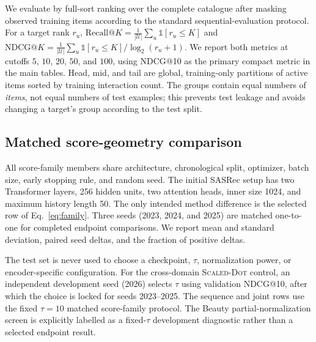 \documentclass[sigconf,anonymous,review]{acmart}
\newcommand{\scaledot}{\textsc{Scaled-Dot}}
\begin{document}
We evaluate by full-sort ranking over the complete catalogue after masking observed training items according to the standard sequential-evaluation protocol. For a target rank $r_u$, $\mathrm{Recall@}K=\frac{1}{|\mathcal U|}\sum_u\mathbb{1}[r_u\leq K]$ and $\mathrm{NDCG@}K=\frac{1}{|\mathcal U|}\sum_u\mathbb{1}[r_u\leq K]/\log_2(r_u+1)$. We report both metrics at cutoffs $5$, $10$, $20$, $50$, and $100$, using NDCG@10 as the primary compact metric in the main tables. Head, mid, and tail are global, training-only partitions of active items sorted by training interaction count. The groups contain equal numbers of \emph{items}, not equal numbers of test examples; this prevents test leakage and avoids changing a target's group according to the test split.

\subsection{Matched score-geometry comparison}
All score-family members share architecture, chronological split, optimizer, batch size, early stopping rule, and random seed. The initial SASRec setup has two Transformer layers, 256 hidden units, two attention heads, inner size 1024, and maximum history length 50. The only intended method difference is the selected row of Eq.~\ref{eq:family}. Three seeds (2023, 2024, and 2025) are matched one-to-one for completed endpoint comparisons. We report mean and standard deviation, paired seed deltas, and the fraction of positive deltas.

The test set is never used to choose a checkpoint, $\tau$, normalization power, or encoder-specific configuration. For the cross-domain \scaledot{} control, an independent development seed (2026) selects $\tau$ using validation NDCG@10, after which the choice is locked for seeds 2023--2025. The sequence and joint rows use the fixed $\tau=10$ matched score-family protocol. The Beauty partial-normalization screen is explicitly labelled as a fixed-$\tau$ development diagnostic rather than a selected endpoint result.
\end{document}
